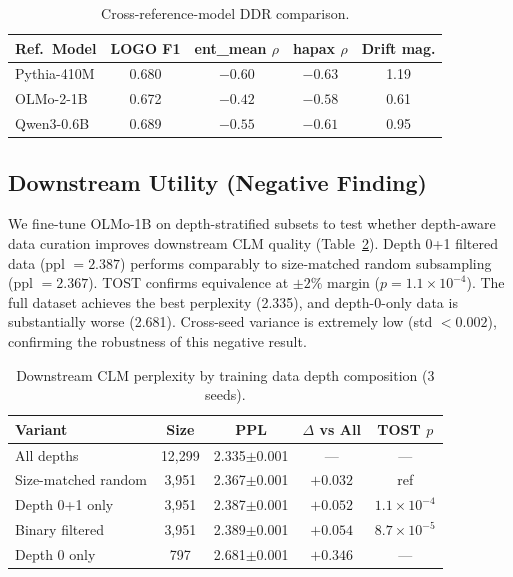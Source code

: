 \documentclass[11pt]{article}
\begin{document}
\begin{table}[t]
\centering
\small
\caption{Cross-reference-model DDR comparison.}
\label{tab:cross_ref}
\begin{tabular}{lcccc}
\toprule
\textbf{Ref.\ Model} & \textbf{LOGO F1} & \textbf{ent\_mean $\rho$} & \textbf{hapax $\rho$} & \textbf{Drift mag.} \\
\midrule
Pythia-410M & 0.680 & $-0.60$ & $-0.63$ & 1.19 \\
OLMo-2-1B & 0.672 & $-0.42$ & $-0.58$ & 0.61 \\
Qwen3-0.6B & 0.689 & $-0.55$ & $-0.61$ & 0.95 \\
\bottomrule
\end{tabular}
\end{table}

\subsection{Downstream Utility (Negative Finding)}
\label{sec:downstream}

We fine-tune OLMo-1B on depth-stratified subsets to test whether depth-aware data curation improves downstream CLM quality (Table~\ref{tab:downstream}). Depth 0+1 filtered data (ppl $= 2.387$) performs comparably to size-matched random subsampling (ppl $= 2.367$). TOST confirms equivalence at $\pm 2\%$ margin ($p = 1.1 \times 10^{-4}$). The full dataset achieves the best perplexity (2.335), and depth-0-only data is substantially worse (2.681). Cross-seed variance is extremely low (std $< 0.002$), confirming the robustness of this negative result.

\begin{table}[t]
\centering
\small
\caption{Downstream CLM perplexity by training data depth composition (3 seeds).}
\label{tab:downstream}
\begin{tabular}{lcccc}
\toprule
\textbf{Variant} & \textbf{Size} & \textbf{PPL} & \textbf{$\Delta$ vs All} & \textbf{TOST $p$} \\
\midrule
All depths & 12,299 & 2.335$\pm$0.001 & --- & --- \\
Size-matched random & 3,951 & 2.367$\pm$0.001 & $+0.032$ & ref \\
Depth 0+1 only & 3,951 & 2.387$\pm$0.001 & $+0.052$ & $1.1\!\times\!10^{-4}$ \\
Binary filtered & 3,951 & 2.389$\pm$0.001 & $+0.054$ & $8.7\!\times\!10^{-5}$ \\
Depth 0 only & 797 & 2.681$\pm$0.001 & $+0.346$ & --- \\
\bottomrule
\end{tabular}
\end{table}
\end{document}
